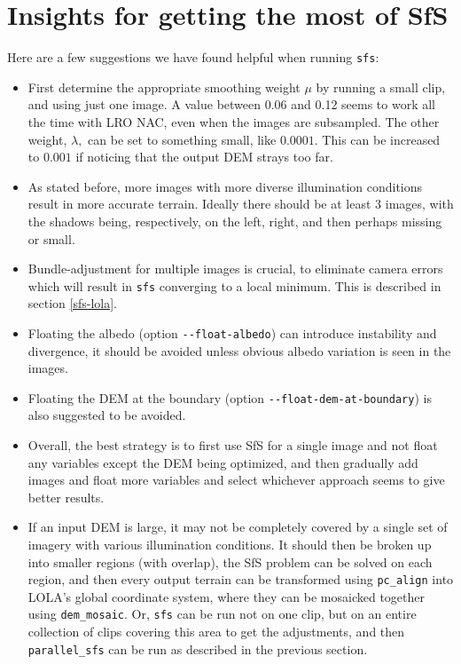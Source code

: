 \section{Insights for getting the most of SfS}
\label{sfs:insights}

Here are a few suggestions we have found helpful when running \texttt{sfs}:

\begin{itemize}{}

\item First determine the appropriate smoothing weight $\mu$ by running a
small clip, and using just one image. A value between 0.06 and 0.12 seems to work 
all the time with LRO NAC, even when the images are subsampled. The other weight, $\lambda,$ can
be set to something small, like $0.0001.$ This can be increased to $0.001$ if noticing
that the output DEM strays too far. 

\item As stated before, more images with more diverse illumination conditions
result in more accurate terrain. Ideally there should be at least 3 images, with the shadows
being, respectively, on the left, right, and then perhaps missing or small. 

\item Bundle-adjustment for multiple images is crucial, to eliminate
  camera errors which will result in \texttt{sfs} converging to a local
  minimum. This is described in section \ref{sfs-lola}.

\item Floating the albedo (option \texttt{-\/-float-albedo}) can
  introduce instability and divergence, it should be avoided unless
  obvious albedo variation is seen in the images.

\item Floating the DEM at the boundary (option
  \texttt{-\/-float-dem-at-boundary}) is also suggested to be avoided.

\item Overall, the best strategy is to first use SfS for a single image
  and not float any variables except the DEM being optimized, and then
  gradually add images and float more variables and select whichever
  approach seems to give better results.

\item If an input DEM is large, it may not be completely covered by a
single set of imagery with various illumination conditions.  It should
then be broken up into smaller regions (with overlap), the SfS problem
can be solved on each region, and then every output terrain can be
transformed using \texttt{pc\_align} into LOLA's global coordinate
system, where they can be mosaicked together using
\texttt{dem\_mosaic}. Or, \texttt{sfs} can be run not on one clip, but
on an entire collection of clips covering this area to get the
adjustments, and then \texttt{parallel\_sfs} can be run as described in
the previous section. 


\end{itemize}
